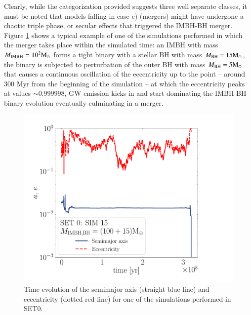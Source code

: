 \documentclass[article]{aa}
\newcommand{\Ms}{{\rm M}_\odot}
\newcommand{\ibh}{{\rm IMBH}}
\newcommand{\bh}{{\rm BH}}
\begin{document}
{Clearly, while the categorization provided suggests three well separate classes, it must be noted that models falling in case c) (mergers) might have undergone a chaotic triple phase, or secular effects that triggered the IMBH-BH merger. Figure \ref{fig:example} shows a typical example of one of the simulations performed in which the merger takes place within the simulated time: an IMBH with mass $M_\ibh = 10^2\Ms$ forms a tight binary with a stellar BH with mass $M_\bh = 15\Ms$, the binary is subjected to perturbation of the outer BH with mass $M_\bh = 5\Ms$ that causes a continuous oscillation of the eccentricity up to the point -- around 300 Myr from the beginning of the simulation -- at which the eccentricity peaks at values $\sim 0.999998$, GW emission kicks in and start dominating the IMBH-BH binary evolution eventually culminating in a merger.  
}
\begin{figure}
\includegraphics[width=\columnwidth]{example}
    \caption{Time evolution of the semimajor axis (straight blue line) and eccentricity (dotted red line) for one of the simulations performed in SET0.}
	\label{fig:example}
\end{figure}
\end{document}
